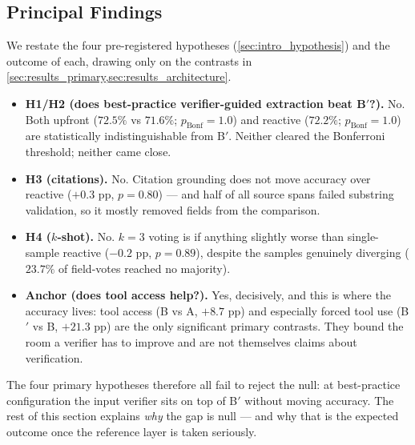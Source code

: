 
\subsection{Principal Findings}
\label{sec:disc_summary}

We restate the four pre-registered hypotheses
(\cref{sec:intro_hypothesis}) and the outcome of each, drawing only on
the contrasts in \cref{sec:results_primary,sec:results_architecture}.

\begin{itemize}\setlength\itemsep{3pt}
  \item \textbf{H1/H2 (does best-practice verifier-guided extraction
        beat B$'$?).} No. Both upfront ($72.5\%$ vs $71.6\%$;
        $p_{\text{Bonf}} = 1.0$) and reactive ($72.2\%$;
        $p_{\text{Bonf}} = 1.0$) are statistically indistinguishable
        from B$'$. Neither cleared the Bonferroni threshold; neither
        came close.
  \item \textbf{H3 (citations).} No. Citation grounding does not move
        accuracy over reactive ($+0.3$ pp, $p = 0.80$) --- and half of
        all source spans failed substring validation, so it mostly
        removed fields from the comparison.
  \item \textbf{H4 ($k$-shot).} No. $k=3$ voting is if anything
        slightly worse than single-sample reactive ($-0.2$ pp,
        $p = 0.89$), despite the samples genuinely diverging
        ($23.7\%$ of field-votes reached no majority).
  \item \textbf{Anchor (does tool access help?).} Yes, decisively, and
        this is where the accuracy lives: tool access (B vs A,
        $+8.7$ pp) and especially forced tool use (B$'$ vs B,
        $+21.3$ pp) are the only significant primary contrasts. They
        bound the room a verifier has to improve and are not themselves
        claims about verification.
\end{itemize}

The four primary hypotheses therefore all fail to reject the null: at
best-practice configuration the input verifier sits on top of B$'$
without moving accuracy. The rest of this section explains \emph{why}
the gap is null --- and why that is the expected outcome once the
reference layer is taken seriously.

